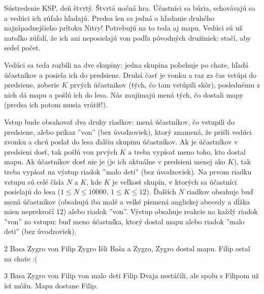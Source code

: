 




Sústredenie KSP, deň štvrtý. Štvrtá nočná hra. Účastníci sa búria, schovávajú 
sa a vedúci ich zúfalo hľadajú. Predsa len sa jedná o hľadanie druhého 
najzápadnejšieho prítoku Nitry! Potrebujú na to teda aj mapu. Vedúci sú už 
natoľko zúfalí, že ich ani neposielajú von podľa pôvodných družiniek: stačí, 
aby sedel počet.

Vedúci sa teda rozbili na dve skupiny: jedna skupina pobehuje po chate, hľadá 
účastníkov a posiela ich do predsiene. Druhá časť je vonku a raz za čas 
vstúpi do predsiene, zoberie $K$ prvých účastnikov (tých, čo tam vstúpili 
skôr), poslednému z nich dá mapu a pošlú ich do lesa. Nás zaujímajú mená tých, 
čo dostali mapy (predsa ich potom musia vrátiť!).

Vstup bude obsahovať dva druhy riadkov: mená účastníkov, čo vstupili do 
predsiene, alebo príkaz ''von'' (bez úvodzoviek), ktorý znamená, že prišli 
vedúci zvonku a chcú poslať do lesa ďalšiu skupinu účastníkov. Ak je 
účastníkov v predsieni dosť, tak pošlú von prvých $K$ a treba vypísať meno 
toho, kto dostal mapu. Ak účastníkov dosť nie je (je ich aktuálne v predsieni 
menej ako $K$), tak treba vypísať na výstup riadok ''malo deti'' (bez 
úvodzoviek).
Na prvom riadku vstupu sú celé čísla $N$ a $K$, kde $K$ je veľkosť skupín, v 
ktorých sa účastníci posielajú do lesa ($1 \leq N \leq 10000$, $1 \leq K 
\leq 12$). Ďalších $N$ riadkov obsahuje buď mená účastníkov (obsahujú iba malé 
a velké písmená anglickej abecedy a dĺžka mien neprekročí $12$) alebo riadok 
''von''.
Výstup obsahuje reakcie na každý riadok ''von'' zo vstupu: buď meno účastníka,
ktorý dostal mapu alebo riadok ''malo deti'' (bez úvodzoviek).

 2
Basa
Zygro
von
Filip
\vystup
Zygro
\komentar
Išli Baša a Zygro, Zygro dostal mapu.
Filip ostal na chate :(
\koniec

 3
Basa
Zygro
von
Filip
von
\vystup
malo deti
Filip
\komentar
Dvaja nestáčili, ale spolu s Filipom už ísť môžu. Mapu dostane Filip.
\koniec


